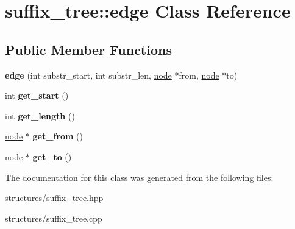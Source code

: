 \hypertarget{classsuffix__tree_1_1edge}{\section{suffix\+\_\+tree\+:\+:edge Class Reference}
\label{classsuffix__tree_1_1edge}
}
\subsection*{Public Member Functions}
\begin{DoxyCompactItemize}
\item 
\hypertarget{classsuffix__tree_1_1edge_a2101385eb3e409588006dacd38cd59ae}{{\bfseries edge} (int substr\+\_\+start, int substr\+\_\+len, \hyperlink{classsuffix__tree_1_1node}{node} $\ast$from, \hyperlink{classsuffix__tree_1_1node}{node} $\ast$to)}\label{classsuffix__tree_1_1edge_a2101385eb3e409588006dacd38cd59ae}

\item 
\hypertarget{classsuffix__tree_1_1edge_a8e51080b2756e7772d88eac1a5188aa3}{int {\bfseries get\+\_\+start} ()}\label{classsuffix__tree_1_1edge_a8e51080b2756e7772d88eac1a5188aa3}

\item 
\hypertarget{classsuffix__tree_1_1edge_a47555d459be07bc7a17a65f8d82fc757}{int {\bfseries get\+\_\+length} ()}\label{classsuffix__tree_1_1edge_a47555d459be07bc7a17a65f8d82fc757}

\item 
\hypertarget{classsuffix__tree_1_1edge_ab6b5b288b71728e20ffa3e4be323be86}{\hyperlink{classsuffix__tree_1_1node}{node} $\ast$ {\bfseries get\+\_\+from} ()}\label{classsuffix__tree_1_1edge_ab6b5b288b71728e20ffa3e4be323be86}

\item 
\hypertarget{classsuffix__tree_1_1edge_a79d2a6a38fbccedd7e3080a90f49e9e8}{\hyperlink{classsuffix__tree_1_1node}{node} $\ast$ {\bfseries get\+\_\+to} ()}\label{classsuffix__tree_1_1edge_a79d2a6a38fbccedd7e3080a90f49e9e8}

\end{DoxyCompactItemize}


The documentation for this class was generated from the following files\+:\begin{DoxyCompactItemize}
\item 
structures/suffix\+\_\+tree.\+hpp\item 
structures/suffix\+\_\+tree.\+cpp\end{DoxyCompactItemize}
